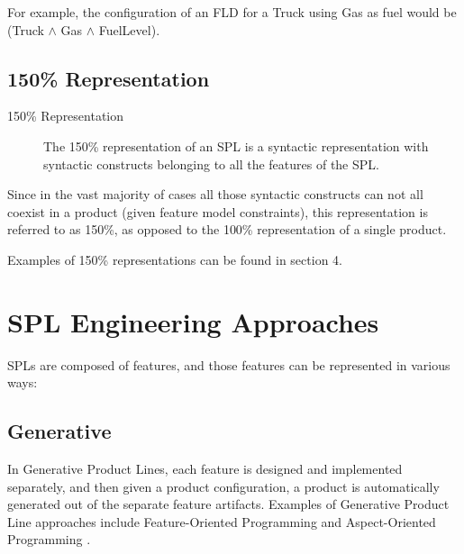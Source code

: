\documentclass[11pt]{article}
\begin{document}
For example, the configuration of an FLD for a Truck using Gas as fuel would be (Truck $\wedge$ Gas $\wedge$ FuelLevel).

\subsection{150\% Representation}

\begin{description}

\item[150\% Representation]
The 150\% representation of an SPL is a syntactic representation with syntactic constructs belonging to all the features of the SPL. 
\end{description}

Since in the vast majority of cases all those syntactic constructs can not all coexist in a product (given feature model constraints), this representation is referred to as 150\%, as opposed to the 100\% representation of a single product.

Examples of 150\% representations can be found in section 4.

\section{SPL Engineering Approaches}

SPLs are composed of features, and those features can be represented in various ways:


\subsection{Generative}

In Generative Product Lines, each feature is designed and implemented separately, and then given a product configuration, a product is automatically generated out of the separate feature artifacts. Examples of Generative Product Line approaches include Feature-Oriented Programming \cite{Prehofer1997} and Aspect-Oriented Programming \cite{Kiczales1997}.
\end{document}
